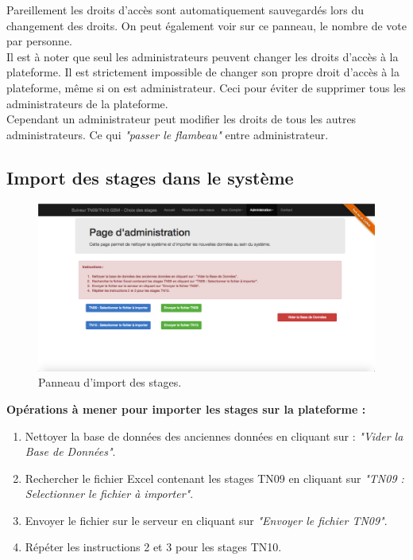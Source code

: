 \documentclass[a4paper,titlepage]{scrartcl}
\begin{document}
\clearpage

Pareillement les droits d'accès sont automatiquement sauvegardés lors du changement des droits. On peut également voir sur ce panneau, le nombre de vote par personne.\\

Il est à noter que seul les administrateurs peuvent changer les droits d'accès à la plateforme. Il est strictement impossible de changer son propre droit d'accès à la plateforme, même si on est administrateur. Ceci pour éviter de supprimer tous les administrateurs de la plateforme.\\
Cependant un administrateur peut modifier les droits de tous les autres administrateurs. Ce qui \textit{"passer le flambeau"} entre administrateur.

\subsection{Import des stages dans le système}

\begin{figure}[H]
	\vspace{-3mm}
	\begin{center}
		\includegraphics[scale=0.33]{Images/admin_upload.png}
		\caption{Panneau d'import des stages.}
		\vspace{-5mm}
	\end{center}
\end{figure}

\textbf{Opérations à mener pour importer les stages sur la plateforme :}

\vspace{5mm}

\begin{enumerate}
	\item Nettoyer la base de données des anciennes données en cliquant sur : \textit{"Vider la Base de Données"}.\\
	
	\item Rechercher le fichier Excel contenant les stages TN09 en cliquant sur \textit{"TN09 : Selectionner le fichier à importer"}.\\
	
	\item Envoyer le fichier sur le serveur en cliquant sur \textit{"Envoyer le fichier TN09"}.\\

	
	\item Répéter les instructions 2 et 3 pour les stages TN10.
	
\end{enumerate}
\end{document}
